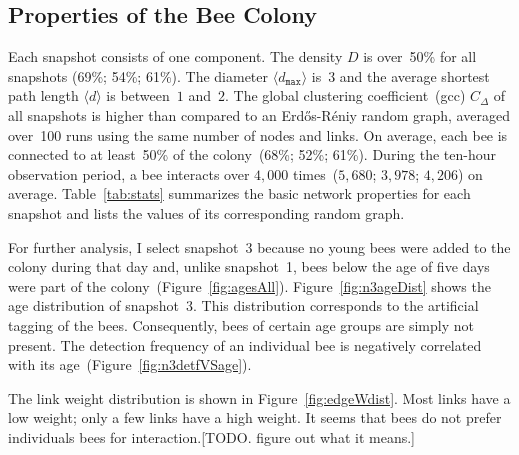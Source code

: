 \subsection{Properties of the Bee Colony}
\label{subsec:colony}
Each snapshot consists of one component.
The density $D$ is over~50\% for all snapshots (69\%; 54\%; 61\%).
The diameter $\langle d_{\texttt{max}} \rangle$ is~$3$ and the average shortest path length $\langle d \rangle$ is between~$1$ and~$2$.
The global clustering coefficient~(gcc) $C_\Delta$ of all snapshots is higher than compared to an Erd\H{o}s-R\'{e}niy random graph, averaged over~100 runs using the same number of nodes and links.
On average, each bee is connected to at least~50\% of the colony~(68\%; 52\%; 61\%).
During the ten-hour observation period, a bee interacts over $4,000$ times~($5,680$; $3,978$; $4,206$) on average.
Table~\ref{tab:stats} summarizes the basic network properties for each snapshot and lists the values of its corresponding random graph.

For further analysis, I select snapshot~3 because no young bees were added to the colony during that day and, unlike snapshot~1, bees below the age of five days were part of the colony~(Figure~\ref{fig:agesAll}).
Figure~\ref{fig:n3ageDist} shows the age distribution of snapshot~3.
This distribution corresponds to the artificial tagging of the bees.
Consequently, bees of certain age groups are simply not present.
The detection frequency of an individual bee is negatively correlated with its age~(Figure~\ref{fig:n3detfVSage}).


The link weight distribution is shown in Figure~\ref{fig:edgeWdist}.
Most links have a low weight; only a few links have a high weight.
It seems that bees do not prefer individuals bees for interaction.[TODO. figure out what it means.]




